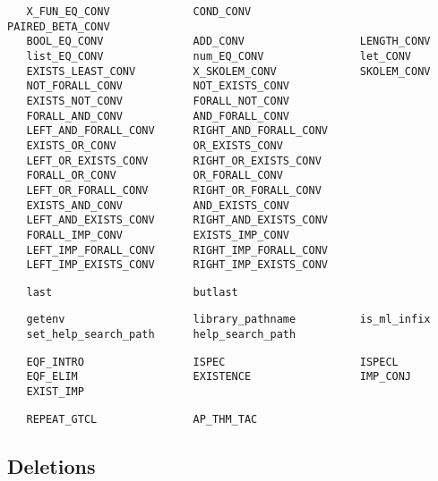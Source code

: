 \begin{hol}\begin{verbatim}
   X_FUN_EQ_CONV             COND_CONV                 PAIRED_BETA_CONV   
   BOOL_EQ_CONV              ADD_CONV                  LENGTH_CONV           
   list_EQ_CONV              num_EQ_CONV               let_CONV              
   EXISTS_LEAST_CONV         X_SKOLEM_CONV             SKOLEM_CONV
   NOT_FORALL_CONV           NOT_EXISTS_CONV    
   EXISTS_NOT_CONV           FORALL_NOT_CONV
   FORALL_AND_CONV           AND_FORALL_CONV    
   LEFT_AND_FORALL_CONV      RIGHT_AND_FORALL_CONV
   EXISTS_OR_CONV            OR_EXISTS_CONV     
   LEFT_OR_EXISTS_CONV       RIGHT_OR_EXISTS_CONV
   FORALL_OR_CONV            OR_FORALL_CONV     
   LEFT_OR_FORALL_CONV       RIGHT_OR_FORALL_CONV
   EXISTS_AND_CONV           AND_EXISTS_CONV    
   LEFT_AND_EXISTS_CONV      RIGHT_AND_EXISTS_CONV
   FORALL_IMP_CONV           EXISTS_IMP_CONV   
   LEFT_IMP_FORALL_CONV      RIGHT_IMP_FORALL_CONV
   LEFT_IMP_EXISTS_CONV      RIGHT_IMP_EXISTS_CONV
\end{verbatim}\end{hol}
\begin{hol}\begin{verbatim}
   last                      butlast
\end{verbatim}\end{hol}
\begin{hol}\begin{verbatim}
   getenv                    library_pathname          is_ml_infix
   set_help_search_path      help_search_path
\end{verbatim}\end{hol}
\begin{hol}\begin{verbatim}
   EQF_INTRO                 ISPEC                     ISPECL 
   EQF_ELIM                  EXISTENCE                 IMP_CONJ           
   EXIST_IMP             
\end{verbatim}\end{hol}
\begin{hol}\begin{verbatim}
   REPEAT_GTCL               AP_THM_TAC
\end{verbatim}\end{hol}


\subsection{Deletions}

